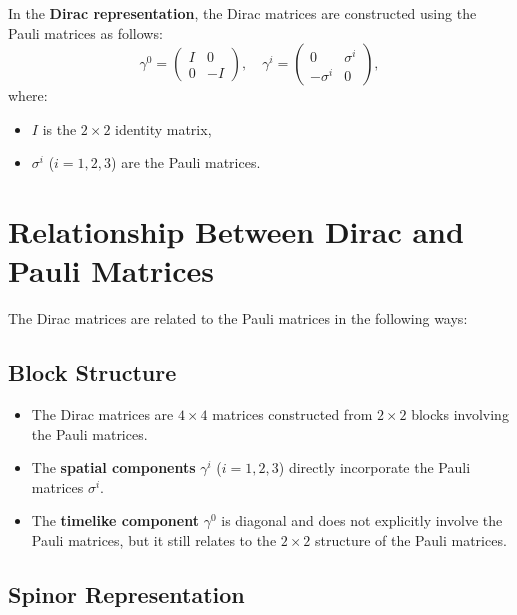 \documentclass{article}
\begin{document}
In the \textbf{Dirac representation}, the Dirac matrices are constructed
using the Pauli matrices as follows: 
\begin{equation*}
\gamma^0 = 
\begin{pmatrix}
I & 0 \\ 
0 & -I%
\end{pmatrix}%
, \quad \gamma^i = 
\begin{pmatrix}
0 & \sigma^i \\ 
-\sigma^i & 0%
\end{pmatrix}%
, 
\end{equation*}
where:

\begin{itemize}
\item $I$ is the $2 \times 2$ identity matrix, 

\item $\sigma^i$ ($i = 1, 2, 3$) are the Pauli matrices.
\end{itemize}

\section*{Relationship Between Dirac and Pauli Matrices}

The Dirac matrices are related to the Pauli matrices in the following ways:

\subsection*{Block Structure}

\begin{itemize}
\item The Dirac matrices are $4 \times 4$ matrices constructed from $2
\times 2$ blocks involving the Pauli matrices. 

\item The \textbf{spatial components} $\gamma^i$ ($i = 1, 2, 3$) directly
incorporate the Pauli matrices $\sigma^i$. 

\item The \textbf{timelike component} $\gamma^0$ is diagonal and does not
explicitly involve the Pauli matrices, but it still relates to the $2 \times
2$ structure of the Pauli matrices.
\end{itemize}

\subsection*{Spinor Representation}
\end{document}
